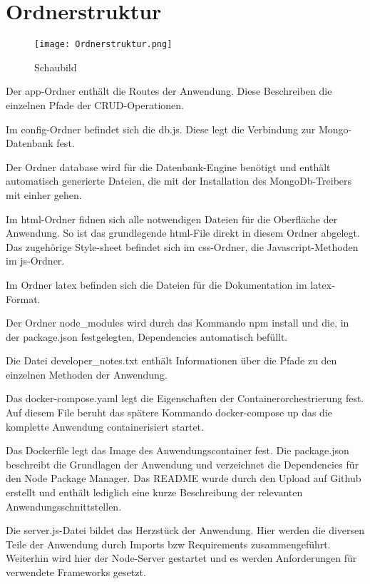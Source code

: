 
\chapter{Ordnerstruktur}
\label{ch:Ordnerstruktur}

\begin{wrapfigure}{r}{0\textwidth}
\centering
\texttt{[image: Ordnerstruktur.png]}
\vspace{4pt}
\caption{Schaubild\footnotemark}
\label{fig:blueant}
\end{wrapfigure}

Der app-Ordner enthält die Routes der Anwendung. Diese Beschreiben die einzelnen Pfade der CRUD-Operationen.

Im config-Ordner befindet sich die db.js. Diese legt die Verbindung zur Mongo-Datenbank fest.

Der Ordner database wird für die Datenbank-Engine benötigt und enthält automatisch generierte Dateien, die mit der Installation des MongoDb-Treibers mit einher gehen.

Im html-Ordner fidnen sich alle notwendigen Dateien für die Oberfläche der Anwendung. So ist das grundlegende html-File direkt in diesem Ordner abgelegt. Das zugehörige Style-sheet befindet sich im css-Ordner, die Javascript-Methoden im js-Ordner.

Im Ordner latex befinden sich die Dateien für die Dokumentation im latex-Format.

Der Ordner node\_modules wird durch das Kommando \glqq  npm install\grqq{} und die, in der package.json festgelegten, Dependencies automatisch befüllt.

Die Datei \glqq  developer\_notes.txt \grqq{} enthält Informationen über die Pfade zu den einzelnen Methoden der Anwendung.

Das docker-compose.yaml legt die Eigenschaften der Containerorchestrierung fest. Auf diesem File beruht das spätere Kommando \glqq  docker-compose up\grqq{} das die komplette Anwendung containerisiert startet.

Das Dockerfile legt das Image des Anwendungscontainer fest.
Die package.json beschreibt die Grundlagen der Anwendung und verzeichnet die Dependencies für den Node Package Manager.
Das README wurde durch den Upload auf Github erstellt und enthält lediglich eine kurze Beschreibung der relevanten Anwendungsschnittstellen.

Die server.js-Datei bildet das Herzstück der Anwendung. Hier werden die diversen Teile der Anwendung durch Imports bzw Requirements zusammengeführt. Weiterhin wird hier der Node-Server gestartet und es werden Anforderungen für verwendete Frameworks gesetzt.